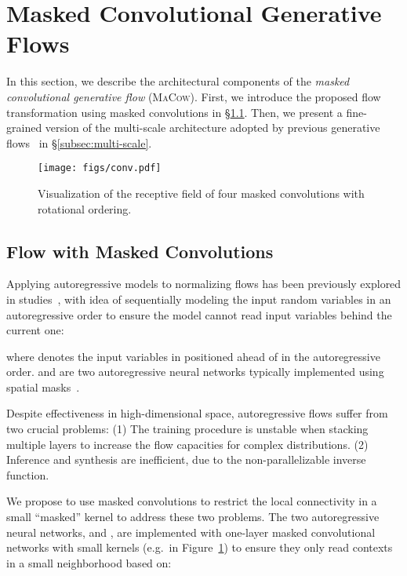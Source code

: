 \documentclass{article}
\begin{document}
\section{Masked Convolutional Generative Flows}\label{sec:macow}
In this section, we describe the architectural components of the \emph{masked convolutional generative flow} (\textsc{MaCow}). 
First, we introduce the proposed flow transformation using masked convolutions in \S\ref{subsec:macow}. 
Then, we present a fine-grained version of the multi-scale architecture adopted by previous generative flows~\citep{dinh2016density,kingma2018glow} in \S\ref{subsec:multi-scale}. 

\begin{figure}[t]
\centering
\texttt{[image: figs/conv.pdf]}
\caption{Visualization of the receptive field of four masked convolutions with rotational ordering.}
\label{fig:mcf}
\end{figure}

\subsection{Flow with Masked Convolutions}\label{subsec:macow}
Applying autoregressive models to normalizing flows has been previously explored in studies~\citep{kingma2016improved,papamakarios2017masked}, with idea of sequentially modeling the input random variables in an autoregressive order to ensure the model cannot read input variables behind the current one:

where  denotes the input variables in  positioned ahead of  in the autoregressive order.
 and  are two autoregressive neural networks typically implemented using spatial masks~\citep{germain2015made,oord2016pixel}.

Despite effectiveness in high-dimensional space, autoregressive flows suffer from two crucial problems: (1) The training procedure is unstable when stacking multiple layers to increase the flow capacities for complex distributions. (2) Inference and synthesis are inefficient, due to the non-parallelizable inverse function.

We propose to use masked convolutions to restrict the local connectivity in a small ``masked'' kernel to address these two problems.
The two autoregressive neural networks,  and , are implemented with one-layer masked convolutional networks with small kernels (e.g.\  in Figure~\ref{fig:mcf}) to ensure they only read contexts in a small neighborhood based on:
\end{document}

